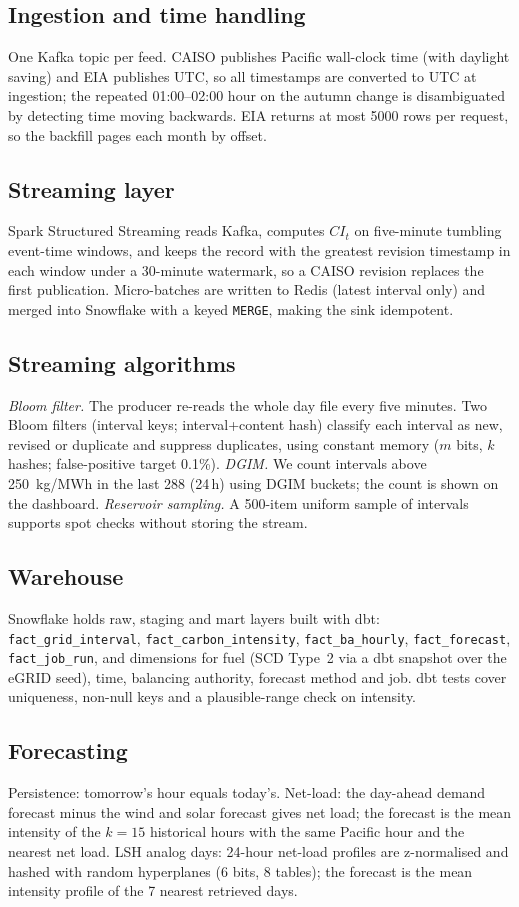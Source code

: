 \documentclass[conference]{IEEEtran}
\begin{document}
\subsection{Ingestion and time handling}
One Kafka topic per feed. CAISO publishes Pacific wall-clock time (with daylight saving) and EIA publishes UTC, so all timestamps are converted to UTC at ingestion; the repeated 01:00--02:00 hour on the autumn change is disambiguated by detecting time moving backwards. EIA returns at most 5000 rows per request, so the backfill pages each month by offset.
\subsection{Streaming layer}
Spark Structured Streaming reads Kafka, computes $CI_t$ on five-minute tumbling event-time windows, and keeps the record with the greatest revision timestamp in each window under a 30-minute watermark, so a CAISO revision replaces the first publication. Micro-batches are written to Redis (latest interval only) and merged into Snowflake with a keyed \texttt{MERGE}, making the sink idempotent.
\subsection{Streaming algorithms}
\emph{Bloom filter.} The producer re-reads the whole day file every five minutes. Two Bloom filters (interval keys; interval+content hash) classify each interval as new, revised or duplicate and suppress duplicates, using constant memory ($m$ bits, $k$ hashes; false-positive target 0.1\%). \emph{DGIM.} We count intervals above \SI{250}{kg/MWh} in the last 288 (24\,h) using DGIM buckets; the count is shown on the dashboard. \emph{Reservoir sampling.} A 500-item uniform sample of intervals supports spot checks without storing the stream.
\subsection{Warehouse}
Snowflake holds raw, staging and mart layers built with dbt: \texttt{fact\_grid\_interval}, \texttt{fact\_carbon\_intensity}, \texttt{fact\_ba\_hourly}, \texttt{fact\_forecast}, \texttt{fact\_job\_run}, and dimensions for fuel (SCD Type~2 via a dbt snapshot over the eGRID seed), time, balancing authority, forecast method and job. dbt tests cover uniqueness, non-null keys and a plausible-range check on intensity.
\subsection{Forecasting}
Persistence: tomorrow's hour equals today's. Net-load: the day-ahead demand forecast minus the wind and solar forecast gives net load; the forecast is the mean intensity of the $k=15$ historical hours with the same Pacific hour and the nearest net load. LSH analog days: 24-hour net-load profiles are z-normalised and hashed with random hyperplanes (6 bits, 8 tables); the forecast is the mean intensity profile of the 7 nearest retrieved days.
\end{document}
